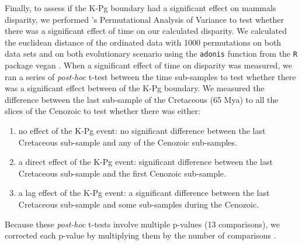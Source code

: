 \documentclass[12pt,letterpaper]{article}
\begin{document}
Finally, to assess if the K-Pg boundary had a significant effect on mammals disparity, we performed \cite{permanova}'s Permutational Analysis of Variance \citep[also referred to as PERMANOVA or NPANOVA; e.g.][]{brusatte50,ruta2013} to test whether there was a significant effect of time on our calculated disparity.
We calculated the euclidean distance of the ordinated data with 1000 permutations on both data sets and on both evolutionary scenario using the \texttt{adonis} function from the \texttt{R} package vegan \citep{vegan}.
When a significant effect of time on disparity was measured, we ran a series of \textit{post-hoc} t-test between the time sub-samples \citep{anderson2012using,zelditch2012geometric,smith2014joined} to test whether there was a significant effect between of the K-Pg boundary.
We measured the difference between the last sub-sample of the Cretaceous (65 Mya) to all the slices of the Cenozoic to test whether there was either:
\begin{enumerate}
    \item{no effect of the K-Pg event: no significant difference between the last Cretaceous sub-sample and any of the Cenozoic sub-samples.}
    \item{a direct effect of the K-Pg event: significant difference between the last Cretaceous sub-sample and the first Cenozoic sub-sample.}
    \item{a lag effect of the K-Pg event: a significant difference between the last Cretaceous sub-sample and some sub-samples during the Cenozoic.}
\end{enumerate}
Because these \textit{post-hoc} t-tests involve multiple p-values (13 comparisons), we corrected each p-value by multiplying them by the number of comparisons \citep[Holm-Bonferonni correction;][]{holm1979simple}.


\end{document}
